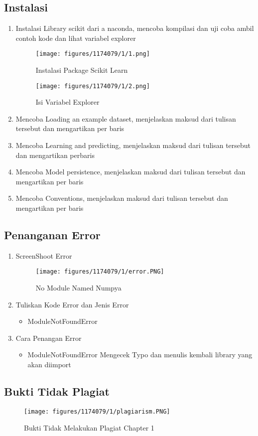 \subsection{Instalasi}
\begin{enumerate}
	\item Instalasi Library scikit dari a naconda, mencoba kompilasi dan uji coba ambil contoh kode dan lihat variabel explorer
	\hfill\break
	\begin{figure}[H]
		\texttt{[image: figures/1174079/1/1.png]}
		\centering
		\caption{Instalasi Package Scikit Learn}
	\end{figure}
	\begin{figure}[H]
		\texttt{[image: figures/1174079/1/2.png]}
		\centering
		\caption{Isi Variabel Explorer}
	\end{figure}
	\item Mencoba Loading an example dataset, menjelaskan maksud dari tulisan tersebut dan mengartikan per baris
	\hfill\break
	
	\item Mencoba Learning and predicting, menjelaskan maksud dari tulisan tersebut dan mengartikan perbaris
	\hfill\break
	
	\item  Mencoba Model persistence, menjelaskan maksud dari tulisan tersebut dan mengartikan per baris
	\hfill\break
	
	\item Mencoba Conventions, menjelaskan maksud dari tulisan tersebut dan mengartikan per baris
	\hfill\break
	
\end{enumerate}

\subsection{Penanganan Error}
\begin{enumerate}
	\item ScreenShoot Error
	\begin{figure}[H]
		\texttt{[image: figures/1174079/1/error.PNG]}
		\centering
		\caption{No Module Named Numpya}
	\end{figure}

	\item Tuliskan Kode Error dan Jenis Error
	\begin{itemize}
		\item ModuleNotFoundError
	\end{itemize}
	\item Cara Penangan Error
	\begin{itemize}
		\item ModuleNotFoundError
		\hfill\break
		Mengecek Typo dan menulis kembali library yang akan diimport
	\end{itemize}
\end{enumerate}

\subsection{Bukti Tidak Plagiat}
\begin{figure}[H]
	\texttt{[image: figures/1174079/1/plagiarism.PNG]}
	\centering
	\caption{Bukti Tidak Melakukan Plagiat Chapter 1}
\end{figure}